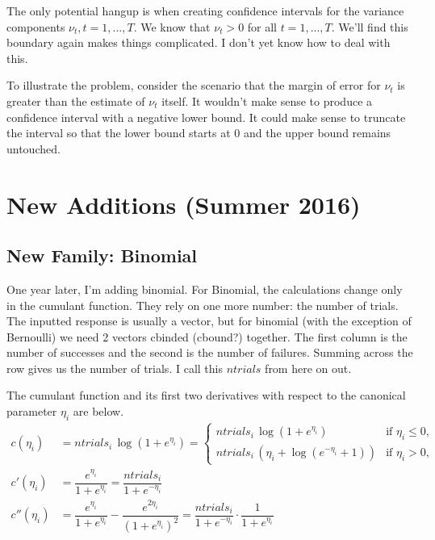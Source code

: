 \documentclass{article}
\begin{document}
The only potential hangup is when creating confidence intervals for the variance components $\nu_t, t=1,...,T$.  We know that $\nu_t >0$ for all $t=1,...,T$. We'll find this boundary again makes things complicated. I don't yet know how to deal with this.  

To illustrate the problem, consider the scenario that the margin of error for $\nu_t$ is greater than the estimate of $\nu_t$ itself. It wouldn't make sense to produce a confidence interval with a negative lower bound. It could make sense to truncate the interval so that the lower bound starts at 0 and the upper bound remains untouched.  

\section{New Additions (Summer 2016)}
\subsection{New Family: Binomial}
One year later, I'm adding binomial. For Binomial, the calculations change only in the cumulant function. They rely on one more number: the number of trials. The inputted response is usually a vector, but for binomial (with the exception of Bernoulli) we need 2 vectors cbinded (cbound?) together. The first column is the number of successes and the second is the number of failures. Summing across the row gives us the number of trials. I call this $ntrials$ from here on out.

The cumulant function and its first two derivatives with respect to the canonical parameter $\eta_i$ are below. 
\begin{align}
c(\eta_i) &=ntrials_i \, \log(1+e^{\eta_i}) =
  \begin{cases}
   ntrials_i \, \log(1+e^{\eta_i}) & \text{if } \eta_i\leq 0,\\
   ntrials_i \,\left(  \eta_i+\log(e^{-\eta_i}+1) \right) & \text{if } \eta_i >0,
  \end{cases}\\
c'(\eta_i)&=\dfrac{ e^{{\eta_{i}}}}{ 1+e^{{\eta_{i}}}} = \dfrac{ntrials_i}{1+e^{-\eta_i}}\\
c''(\eta_i)&=   \dfrac{e^{{\eta_{i}}}}{  1+ e^{{\eta_{i}}} }  - \dfrac{e^{2{\eta_{i}}}}{    (  1+ e^{{\eta_{i}}})^2}  = \dfrac{ntrials_i}{1+e^{-\eta_i}}\cdot \dfrac{1}{1+e^{\eta_i}}
\end{align}
\end{document}
